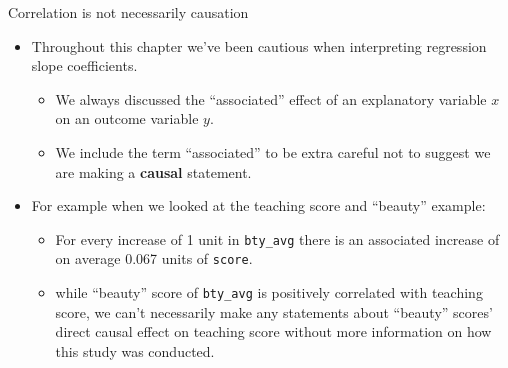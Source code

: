\documentclass[
  ignorenonframetext,
]{beamer}
\providecommand{\tightlist}{%
  \setlength{\itemsep}{0pt}\setlength{\parskip}{0pt}}
\begin{document}
\begin{frame}[fragile]{Correlation is not necessarily causation}
\protect\hypertarget{correlation-is-not-necessarily-causation}{}
\begin{itemize}
\item
  Throughout this chapter we've been cautious when interpreting
  regression slope coefficients.

  \begin{itemize}
  \tightlist
  \item
    We always discussed the ``associated'' effect of an explanatory
    variable \(x\) on an outcome variable \(y\).
  \item
    We include the term ``associated'' to be extra careful not to
    suggest we are making a \textbf{causal} statement.
  \end{itemize}
\item
  For example when we looked at the teaching score and ``beauty''
  example:

  \begin{itemize}
  \item
    For every increase of 1 unit in \texttt{bty\_avg} there is an
    associated increase of on average 0.067 units of \texttt{score}.
  \item
    while ``beauty'' score of \texttt{bty\_avg} is positively correlated
    with teaching score, we can't necessarily make any statements about
    ``beauty'' scores' direct causal effect on teaching score without
    more information on how this study was conducted.
  \end{itemize}
\end{itemize}
\end{frame}
\end{document}
